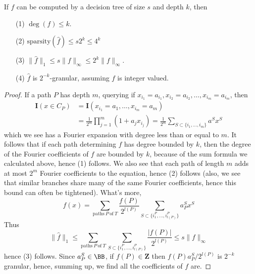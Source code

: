 \begin{theorem}
    If $f$ can be computed by a decision tree of size $s$ and depth $k$, then
    \begin{enumerate}
        \item[(1)] $\deg(f) \leq k$.
        \item[(2)] $\text{sparsity}(\widehat{f}) \leq s2^k \leq 4^k$
        \item[(3)] $\| \widehat{f} \|_1 \leq s \| f \|_\infty \leq 2^k \| f \|_\infty$.
        \item[(4)] $\widehat{f}$ is $2^{-k}$-granular, assuming $f$ is integer valued.
    \end{enumerate}
\end{theorem}
\begin{proof}
    If a path $P$ has depth $m$, querying if $x_{i_1} = a_{i_1}, x_{i_2} = a_{i_2}, \dots, x_{i_m} = a_{i_m}$, then
    \begin{align*}
        \mathbf{I}(x \in C_P) &= \mathbf{I}(x_{i_1} = a_1, \dots, x_{i_m} = a_m)\\
        &= \frac{1}{2^m} \prod_{j = 1}^m \left( 1 + a_j x_{i_j} \right) = \frac{1}{2^m} \sum_{S \subset \{ i_1, \dots, i_m \}} a^Sx^S
    \end{align*}
    which we see has a Fourier expansion with degree less than or equal to $m$. It follows that if each path determining $f$ has degree bounded by $k$, then the degree of the Fourier coefficients of $f$ are bounded by $k$, because of the sum formula we calculated above, hence (1) follows. We also see that each path of length $m$ adds at most $2^m$ Fourier coefficients to the equation, hence (2) follows (also, we see that similar branches share many of the same Fourier coefficients, hence this bound can often be tightened). What's more,
    \[ f(x) = \sum_{\text{paths}\ P\ \text{of}\ T} \frac{f(P)}{2^{l(P)}} \sum_{S \subset \{ i^P_1, \dots, i^P_{l(P)} \} } a_P^Sx^S \]
    Thus
    \[ \| \widehat{f} \|_1 \leq \sum_{\text{paths}\ P\ \text{of}\ T} \sum_{S \subset \{ i^P_1, \dots, i^P_{l(P)} \}} \frac{|f(P)|}{2^{l(P)}} \leq s \| f \|_\infty \]
    hence (3) follows. Since $a_P^S \in \BB$, if $f(P) \in \mathbf{Z}$ then $f(P) a_P^S / 2^{l(P)}$ is $2^{-k}$ granular, hence, summing up, we find all the coefficients of $f$ are.
\end{proof}

